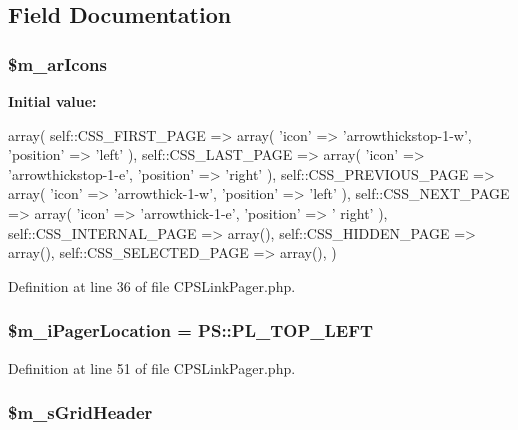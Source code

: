 \subsection{Field Documentation}
\hypertarget{classCPSLinkPager_ae4118d5b329c49bd2c9fd36ff81b97bc}{
\subsubsection[{\$m\_\-arIcons}]{\setlength{\rightskip}{0pt plus 5cm}\$m\_\-arIcons}}
\label{classCPSLinkPager_ae4118d5b329c49bd2c9fd36ff81b97bc}
{\bfseries Initial value:}
\begin{DoxyCode}
 array(
        self::CSS_FIRST_PAGE => array( 'icon' => 'arrowthickstop-1-w', 'position'
       => 'left' ),
        self::CSS_LAST_PAGE => array( 'icon' => 'arrowthickstop-1-e', 'position' 
      => 'right' ),
        self::CSS_PREVIOUS_PAGE => array( 'icon' => 'arrowthick-1-w', 'position' 
      => 'left' ),
        self::CSS_NEXT_PAGE => array( 'icon' => 'arrowthick-1-e', 'position' => '
      right' ),
        self::CSS_INTERNAL_PAGE => array(),
        self::CSS_HIDDEN_PAGE => array(),
        self::CSS_SELECTED_PAGE => array(),
    )
\end{DoxyCode}


Definition at line 36 of file CPSLinkPager.php.

\hypertarget{classCPSLinkPager_a7e3aac300195da83237f2dd67597ef48}{
\subsubsection[{\$m\_\-iPagerLocation}]{\setlength{\rightskip}{0pt plus 5cm}\$m\_\-iPagerLocation = PS::PL\_\-TOP\_\-LEFT}}
\label{classCPSLinkPager_a7e3aac300195da83237f2dd67597ef48}


Definition at line 51 of file CPSLinkPager.php.

\hypertarget{classCPSLinkPager_ab673af639dc3ac6ee6389566f2429afa}{
\subsubsection[{\$m\_\-sGridHeader}]{\setlength{\rightskip}{0pt plus 5cm}\$m\_\-sGridHeader}}
\label{classCPSLinkPager_ab673af639dc3ac6ee6389566f2429afa}


